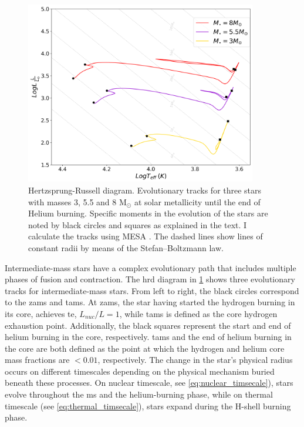 \begin{figure}[H]
    \centering
    \includegraphics[width=0.9\textwidth]{Thesis/graphs/HR_inter_stars.pdf}
    \caption{Hertzsprung-Russell diagram. Evolutionary tracks for three stars with masses 3, 5.5 and 8 M$_{\odot}$ at solar metallicity until the end of Helium burning. Specific moments in the evolution of the stars are noted by black circles and squares as explained in the text. I calculate the tracks using MESA \citep{paxton2010modules,paxton2013modules,paxton2015modules,paxton2019modules}. The dashed lines show lines of constant radii by means of the Stefan–Boltzmann law.}
    \label{fig:HR_inter_stars}
\end{figure}
Intermediate-mass stars have a complex evolutionary path that includes multiple phases of fusion and contraction. The \ac{hrd} diagram in \cref{fig:HR_inter_stars} shows three evolutionary tracks for intermediate-mass stars. From left to right, the black circles correspond to the \ac{zams} and \ac{tams}. At \ac{zams}, the star having started the hydrogen burning in its core, achieves \ac{te}, $L_{nuc}/L =1$, while \ac{tams} is defined as the core hydrogen exhaustion point. Additionally, the black squares represent the start and end of helium burning in the core, respectively.
\ac{tams} and the end of helium burning in the core are both defined as the point at which the hydrogen and helium core mass fractions are $< 0.01$, respectively. The change in the star's physical radius occurs on different timescales depending on the physical mechanism buried beneath these processes. On nuclear timescale, see \cref{eq:nuclear_timsecale}), stars evolve throughout the \ac{ms} and the helium-burning phase, while on thermal timescale (see  \cref{eq:thermal_timsecale}), stars expand during the H-shell burning phase.
